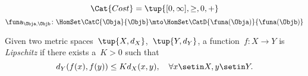 {\begin{forslides}
\begin{equation}
            \label{eq:cost_cat}
            \Cat{Cost}=\tup{[0,\infty], \geq, 0, +}
        \end{equation}
        \begin{equation}
            \label{eq:enriched_fun_a}
            \funa_{\Obja, \Objb} \colon \HomSet\CatC{\Obja}{\Objb} \mto \HomSet\CatD{\funa(\Obja)}{\funa(\Objb)}
        \end{equation}
        \begin{definition}
            \label{def:cost_enrich_a}
            Given two metric spaces~$\tup{X,d_X}$,~$\tup{Y,d_Y}$, a function~$f\colon X\to Y$ is \emph{Lipschitz} if there exists a~$K>0$ such that
            \begin{equation}
                d_Y(f(x),f(y))\leq Kd_X(x,y),\quad \forall x\setin X,y\setin Y.
            \end{equation}
        \end{definition}
    \end{forslides}
}

